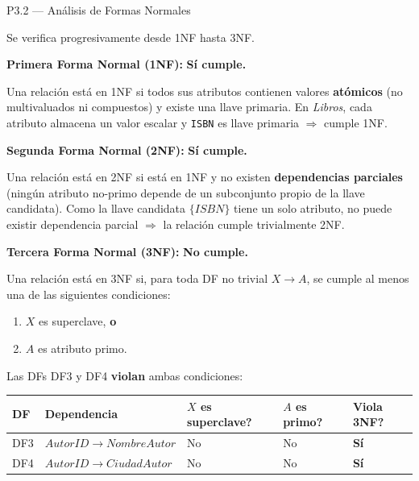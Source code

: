 \documentclass[12pt,a4paper]{article}
\begin{document}
\vspace{0.6cm}

\begin{querybox}{P3.2 --- Análisis de Formas Normales}

Se verifica progresivamente desde 1NF hasta 3NF.

\vspace{0.4cm}
\textbf{Primera Forma Normal (1NF):} \textcolor{OliveGreen}{\textbf{Sí cumple.}}

Una relación está en 1NF si todos sus atributos contienen valores
\textbf{atómicos} (no multivaluados ni compuestos) y existe una llave primaria.
En \textit{Libros}, cada atributo almacena un valor escalar y \texttt{ISBN}
es llave primaria $\Rightarrow$ cumple 1NF.

\vspace{0.5cm}
\textbf{Segunda Forma Normal (2NF):} \textcolor{OliveGreen}{\textbf{Sí cumple.}}

Una relación está en 2NF si está en 1NF y no existen
\textbf{dependencias parciales} (ningún atributo no-primo depende de un
subconjunto propio de la llave candidata).
Como la llave candidata $\{ISBN\}$ tiene un solo atributo, no puede existir
dependencia parcial $\Rightarrow$ la relación cumple trivialmente 2NF.

\vspace{0.5cm}
\textbf{Tercera Forma Normal (3NF):} \textcolor{BrickRed}{\textbf{No cumple.}}

Una relación está en 3NF si, para toda DF no trivial $X \to A$, se cumple
al menos una de las siguientes condiciones:
\begin{enumerate}[label=(\arabic*),leftmargin=2em]
  \item $X$ es superclave, \textbf{o}
  \item $A$ es atributo primo.
\end{enumerate}

Las DFs DF3 y DF4 \textbf{violan} ambas condiciones:

\begin{center}
\begin{tabular}{lllll}
  \toprule
  \textbf{DF} & \textbf{Dependencia} & \textbf{$X$ es superclave?} & \textbf{$A$ es primo?} & \textbf{Viola 3NF?} \\
  \midrule
  DF3 & $AutorID \to NombreAutor$ & No & No & \textcolor{BrickRed}{\textbf{Sí}} \\
  DF4 & $AutorID \to CiudadAutor$ & No & No & \textcolor{BrickRed}{\textbf{Sí}} \\
  \bottomrule
\end{tabular}
\end{center}


\end{querybox}
\end{document}
